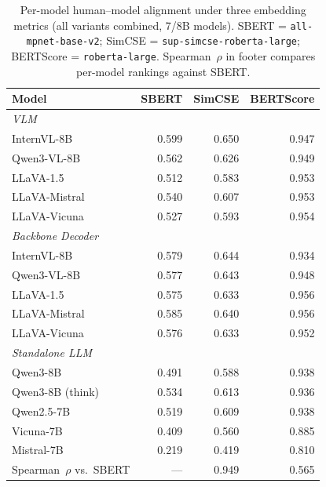 \begin{table}[h]
\centering
\small
\setlength{\tabcolsep}{4pt}
\caption{Per-model human--model alignment under three embedding metrics (all variants combined, 7/8B models). SBERT = \texttt{all-mpnet-base-v2}; SimCSE = \texttt{sup-simcse-roberta-large}; BERTScore = \texttt{roberta-large}. Spearman~$\rho$ in footer compares per-model rankings against SBERT.}
\label{tab:robustness_embedding_per_model}
\begin{tabular}{lrrr}
\toprule
\textbf{Model} & \textbf{SBERT} & \textbf{SimCSE} & \textbf{BERTScore} \\
\midrule
\multicolumn{4}{l}{\textit{VLM}} \\
\quad InternVL-8B & 0.599 & 0.650 & 0.947 \\
\quad Qwen3-VL-8B & 0.562 & 0.626 & 0.949 \\
\quad LLaVA-1.5 & 0.512 & 0.583 & 0.953 \\
\quad LLaVA-Mistral & 0.540 & 0.607 & 0.953 \\
\quad LLaVA-Vicuna & 0.527 & 0.593 & 0.954 \\
\midrule
\multicolumn{4}{l}{\textit{Backbone Decoder}} \\
\quad InternVL-8B & 0.579 & 0.644 & 0.934 \\
\quad Qwen3-VL-8B & 0.577 & 0.643 & 0.948 \\
\quad LLaVA-1.5 & 0.575 & 0.633 & 0.956 \\
\quad LLaVA-Mistral & 0.585 & 0.640 & 0.956 \\
\quad LLaVA-Vicuna & 0.576 & 0.633 & 0.952 \\
\midrule
\multicolumn{4}{l}{\textit{Standalone LLM}} \\
\quad Qwen3-8B & 0.491 & 0.588 & 0.938 \\
\quad Qwen3-8B (think) & 0.534 & 0.613 & 0.936 \\
\quad Qwen2.5-7B & 0.519 & 0.609 & 0.938 \\
\quad Vicuna-7B & 0.409 & 0.560 & 0.885 \\
\quad Mistral-7B & 0.219 & 0.419 & 0.810 \\
\midrule
Spearman~$\rho$ vs.\ SBERT & --- & 0.949 & 0.565 \\
\bottomrule
\end{tabular}
\end{table}
